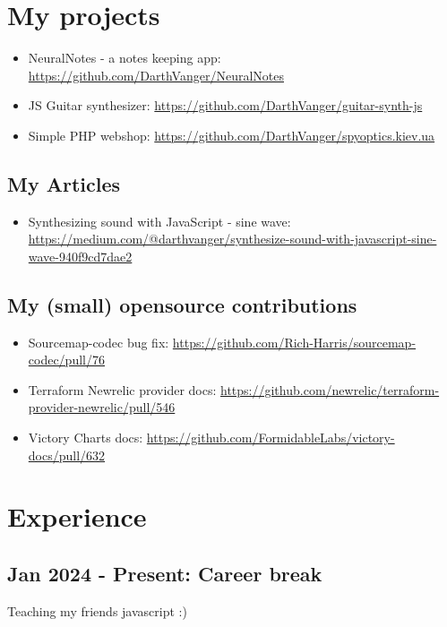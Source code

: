 \documentclass[a4paper, 14pt]{article}
\begin{document}
\section{My projects}
  \begin{itemize}
    \item NeuralNotes - a notes keeping app: \url{https://github.com/DarthVanger/NeuralNotes} \\
    \item JS Guitar synthesizer: \url{https://github.com/DarthVanger/guitar-synth-js} \\
    \item Simple PHP webshop: \url{https://github.com/DarthVanger/spyoptics.kiev.ua}
  \end{itemize}

  \subsection{My Articles}
    \begin{itemize}
      \item Synthesizing sound with JavaScript - sine wave: \url{https://medium.com/@darthvanger/synthesize-sound-with-javascript-sine-wave-940f9cd7dae2}
    \end{itemize}

  \subsection{My (small) opensource contributions}
    \begin{itemize}
      \item Sourcemap-codec bug fix: \url{https://github.com/Rich-Harris/sourcemap-codec/pull/76} \\
      \item Terraform Newrelic provider docs: \url{https://github.com/newrelic/terraform-provider-newrelic/pull/546} \\
      \item Victory Charts docs: \url{https://github.com/FormidableLabs/victory-docs/pull/632}
    \end{itemize}

\section{Experience}
  \subsection{Jan 2024 - Present: Career break}
    Teaching my friends javascript :)
\end{document}
